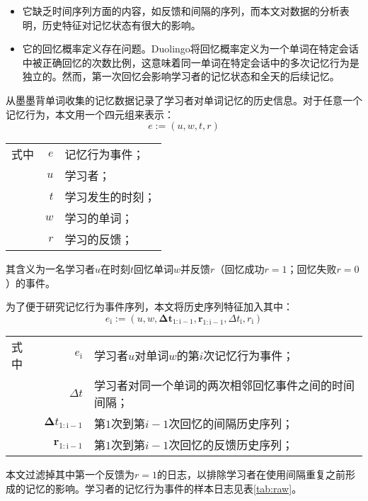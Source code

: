 \begin{itemize}
    \item 它缺乏时间序列方面的内容，如反馈和间隔的序列，而本文对数据的分析表明，历史特征对记忆状态有很大的影响。
    \item 它的回忆概率定义存在问题。Duolingo将回忆概率定义为一个单词在特定会话中被正确回忆的次数比例，这意味着同一单词在特定会话中的多次记忆行为是独立的。然而，第一次回忆会影响学习者的记忆状态和全天的后续记忆。
\end{itemize}

从墨墨背单词收集的记忆数据记录了学习者对单词记忆的历史信息。对于任意一个记忆行为，本文用一个四元组来表示：
\begin{equation}
e :=(u, w, t, r)
\end{equation}
\begin{tabularx}{\textwidth}{@{}l@{\quad}r@{———}X@{}}
    式中& $e$ &记忆行为事件；\\
    &  $u$ &学习者；\\
    &  $t$ &学习发生的时刻；\\
    &  $w$ &学习的单词；\\
    &  $r$ &学习的反馈；
\end{tabularx}\vspace{3.15bp}
其含义为一名学习者$u$在时刻$t$回忆单词$w$并反馈$r$（回忆成功$r=1$；回忆失败$r=0$）的事件。

为了便于研究记忆行为事件序列，本文将历史序列特征加入其中：
\begin{equation}
\label{eqn:event}
e_\mathrm{i} :=(u, w, \bm{\Delta t_\mathrm{1:i-1}}, \bm r_\mathrm{1:i-1} , \Delta t_\mathrm{i} , r_\mathrm{i})
\end{equation}
\begin{tabularx}{\textwidth}{@{}l@{\quad}r@{———}X@{}}
    式中& $e_\mathrm{i}$ &学习者$u$对单词$w$的第$i$次记忆行为事件；\\
    &  $\Delta t$ &学习者对同一个单词的两次相邻回忆事件之间的时间间隔；\\
    &  $\bm \Delta t_\mathrm{1:i-1}$ &第$1$次到第$i-1$次回忆的间隔历史序列；\\
    &  $\bm r_\mathrm{1:i-1}$ &第$1$次到第$i-1$次回忆的反馈历史序列；
\end{tabularx}\vspace{3.15bp}

本文过滤掉其中第一个反馈为$r=1$的日志，以排除学习者在使用间隔重复之前形成的记忆的影响。学习者的记忆行为事件的样本日志见表\ref{tab:raw}。

